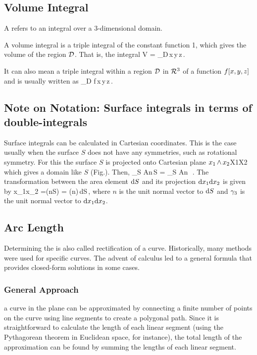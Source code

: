 \subsection{Volume Integral}
A  refers to an integral over a 3-dimensional domain.

A volume integral is a triple integral of the constant function 1, which gives the volume of the region $\mathcal{D}$. That is, the integral
\beq
V = \iiint_{\region D}\,\dx x\,\dx y\,\dx z\,.
\eeq

It can also mean a triple integral within a region $\mathcal{D}$ in $\mathcal{R}^{3}$ of a function $f\!\left[{x,y,z}\right]$ and is usually written as
\beq
\iiint_D f\,\dx x\,\dx y\,\dx z\,.
\eeq


\subsection{Note on Notation: Surface integrals in terms of double-integrals}
Surface integrals can be calculated in Cartesian coordinates. This is the case usually when the surface $S$ does not have any symmetries, such as rotational symmetry. For this the surface $S$ is projected onto Cartesian plane $x_1\operatorname{\wedge} x_2$X1X2 which gives a domain like $S$ (Fig.). Then, 
\beq
\int_S A\iprod n\,\dx S = \iint_S A\iprod n\, \,.
\eeq
The transformation between the area element $\text{d} S$ and its projection $\text{d} x_1\text{d} x_2$ is given by 
\beq
\dx x_1\dx x_2 =(n\dx S)\iprod {} = (n\iprod {})\,dS\,,
\eeq
where $n$ is the unit normal vector to $\text{d} S$ and $\gamma_{3}$ is the unit normal vector to $\text{d} x_1\text{d} x_2$.


\subsection{Arc Length}
Determining the  is also called rectification of a curve. Historically, many methods were used for specific curves. The advent of calculus led to a general formula that provides closed-form solutions in some cases.


\subsubsection{General Approach}
a curve in the plane can be approximated by connecting a finite number of points on the curve using line segments to create a polygonal path. Since it is straightforward to calculate the length of each linear segment (using the Pythagorean theorem in Euclidean space, for instance), the total length of the approximation can be found by summing the lengths of each linear segment.

